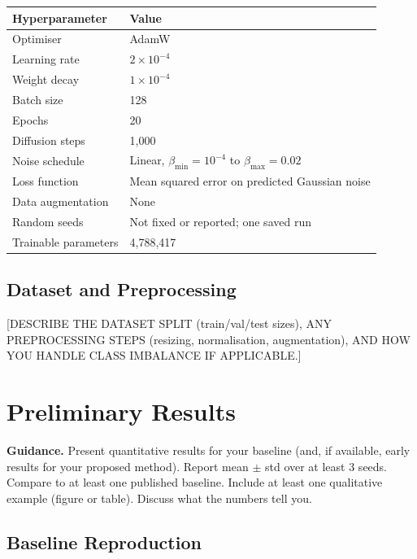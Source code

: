 \documentclass[11pt, letterpaper]{article}
\begin{document}
\begin{center}
\begin{tabular}{ll}
\toprule
\textbf{Hyperparameter} & \textbf{Value} \\
\midrule
Optimiser & AdamW \\
Learning rate & $2\times10^{-4}$ \\
Weight decay & $1\times10^{-4}$ \\
Batch size & 128 \\
Epochs & 20 \\
Diffusion steps & 1,000 \\
Noise schedule & Linear, $\beta_{\min}=10^{-4}$ to $\beta_{\max}=0.02$ \\
Loss function & Mean squared error on predicted Gaussian noise \\
Data augmentation & None \\
Random seeds & Not fixed or reported; one saved run \\
Trainable parameters & 4,788,417 \\
\bottomrule
\end{tabular}
\end{center}

\subsection{Dataset and Preprocessing}

[DESCRIBE THE DATASET SPLIT (train/val/test sizes), ANY PREPROCESSING STEPS
(resizing, normalisation, augmentation), AND HOW YOU HANDLE CLASS IMBALANCE
IF APPLICABLE.]

\section{Preliminary Results}

\begin{guidancebox}
\textbf{Guidance.} Present quantitative results for your baseline (and, if
available, early results for your proposed method). Report mean $\pm$ std over
at least 3 seeds. Compare to at least one published baseline. Include at least
one qualitative example (figure or table). Discuss what the numbers tell you.
\end{guidancebox}

\subsection{Baseline Reproduction}
\end{document}
